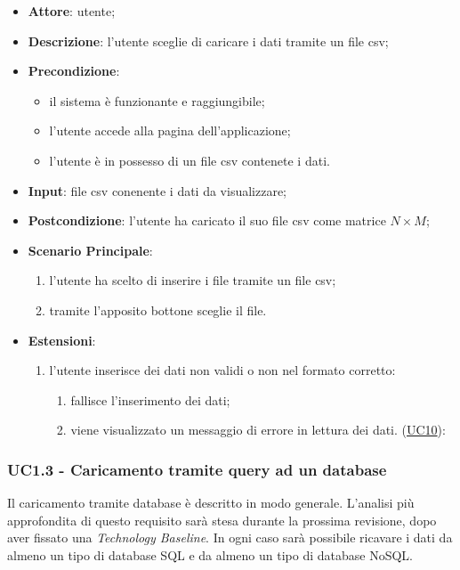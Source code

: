     \begin{itemize}
    \item \textbf{Attore}: utente;
    \item \textbf{Descrizione}: l'utente sceglie di caricare i dati tramite un file csv;
    \item \textbf{Precondizione}:
    \begin{itemize}
        \item il sistema è funzionante e raggiungibile;
        \item l'utente accede alla pagina dell'applicazione;
        \item l'utente è in possesso di un file csv contenete i dati.
    \end{itemize}
    \item \textbf{Input}: file csv conenente i dati da visualizzare;
    \item \textbf{Postcondizione}: l'utente ha caricato il suo file csv come matrice $N\times M$;
    \item \textbf{Scenario Principale}: 
        \begin{enumerate}
            \item l'utente ha scelto di inserire i file tramite un file csv;
            \item tramite l'apposito bottone sceglie il file.
        \end{enumerate}
        \item \textbf{Estensioni}:
        \begin{enumerate}
            \item l'utente inserisce dei dati non validi o non nel formato corretto:
                \begin{enumerate}
                    \item fallisce l'inserimento dei dati;
                    \item viene visualizzato un messaggio di errore in lettura dei dati. (\hyperref[uc10]{UC10}):
                \end{enumerate}
        \end{enumerate}  
    \end{itemize}

    
    \subsubsection{UC1.3 - Caricamento tramite query ad un database}
    \label{uc1.3}
    
    Il caricamento tramite database è descritto in modo generale. L'analisi più approfondita di questo requisito sarà stesa durante la prossima revisione, dopo aver fissato una \emph{Technology Baseline}. In ogni caso sarà possibile ricavare i dati da almeno un tipo di database SQL e da almeno un tipo di database NoSQL.
    
